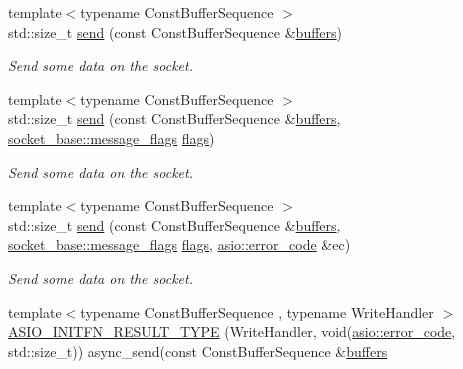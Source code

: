 \begin{DoxyCompactItemize}
{\footnotesize template$<$typename Const\+Buffer\+Sequence $>$ }\\std\+::size\+\_\+t \hyperlink{classasio_1_1basic__stream__socket_af5bb44446d47423959c14c28a41a3dd8}{send} (const Const\+Buffer\+Sequence \&\hyperlink{group__async__read_ga54dede45c3175148a77fe6635222c47d}{buffers})
\begin{DoxyCompactList}\small\item\em Send some data on the socket. \end{DoxyCompactList}\item 
{\footnotesize template$<$typename Const\+Buffer\+Sequence $>$ }\\std\+::size\+\_\+t \hyperlink{classasio_1_1basic__stream__socket_afe228e06332e5ed761f87045e77b5e41}{send} (const Const\+Buffer\+Sequence \&\hyperlink{group__async__read_ga54dede45c3175148a77fe6635222c47d}{buffers}, \hyperlink{classasio_1_1socket__base_ac3cf77465dfedfe1979b5415cf32cc94}{socket\+\_\+base\+::message\+\_\+flags} \hyperlink{classasio_1_1basic__stream__socket_a49da9b10ef73407f4991c633ced27111}{flags})
\begin{DoxyCompactList}\small\item\em Send some data on the socket. \end{DoxyCompactList}\item 
{\footnotesize template$<$typename Const\+Buffer\+Sequence $>$ }\\std\+::size\+\_\+t \hyperlink{classasio_1_1basic__stream__socket_a76f64068ffaf3715a242602cbef085e9}{send} (const Const\+Buffer\+Sequence \&\hyperlink{group__async__read_ga54dede45c3175148a77fe6635222c47d}{buffers}, \hyperlink{classasio_1_1socket__base_ac3cf77465dfedfe1979b5415cf32cc94}{socket\+\_\+base\+::message\+\_\+flags} \hyperlink{classasio_1_1basic__stream__socket_a49da9b10ef73407f4991c633ced27111}{flags}, \hyperlink{classasio_1_1error__code}{asio\+::error\+\_\+code} \&ec)
\begin{DoxyCompactList}\small\item\em Send some data on the socket. \end{DoxyCompactList}\item 
{\footnotesize template$<$typename Const\+Buffer\+Sequence , typename Write\+Handler $>$ }\\\hyperlink{classasio_1_1basic__stream__socket_afcace4f7f04c4ac287edd53e23eb9985}{A\+S\+I\+O\+\_\+\+I\+N\+I\+T\+F\+N\+\_\+\+R\+E\+S\+U\+L\+T\+\_\+\+T\+Y\+P\+E} (Write\+Handler, void(\hyperlink{classasio_1_1error__code}{asio\+::error\+\_\+code}, std\+::size\+\_\+t)) async\+\_\+send(const Const\+Buffer\+Sequence \&\hyperlink{group__async__read_ga54dede45c3175148a77fe6635222c47d}{buffers}

\end{DoxyCompactItemize}
